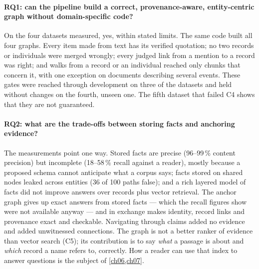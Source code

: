 \paragraph{RQ1: can the pipeline build a correct, provenance-aware, entity-centric graph without domain-specific
code?} On the four datasets measured, yes, within stated limits. The same code built all four graphs. Every item
made from text has its verified quotation; no two records or individuals were merged wrongly; every judged link from
a mention to a record was right; and walks from a record or an individual reached only chunks that concern it, with
one exception on documents describing several events. These gates were reached through development on three of
the datasets and held without changes on the fourth, unseen one. The fifth dataset that failed C4 shows that they
are not guaranteed.

\paragraph{RQ2: what are the trade-offs between storing facts and anchoring evidence?} The measurements point one
way. Stored facts are precise (96--99\,\% content precision) but incomplete (18--58\,\% recall against a reader),
mostly because a proposed schema cannot anticipate what a corpus says; facts stored on shared nodes leaked across
entities (36 of 100 paths false); and a rich layered model of facts did not improve answers over records plus
vector retrieval. The anchor graph gives up exact answers from stored facts --- which the recall figures show were
not available anyway --- and in exchange makes identity, record links and provenance exact and checkable.
Navigating through claims added no evidence and added unwitnessed connections. The graph is not a better ranker of
evidence than vector search (C5); its contribution is to say \emph{what} a passage is about and \emph{which} record
a name refers to, correctly. How a reader can use that index to answer questions is the subject of
\cref{ch06,ch07}.
